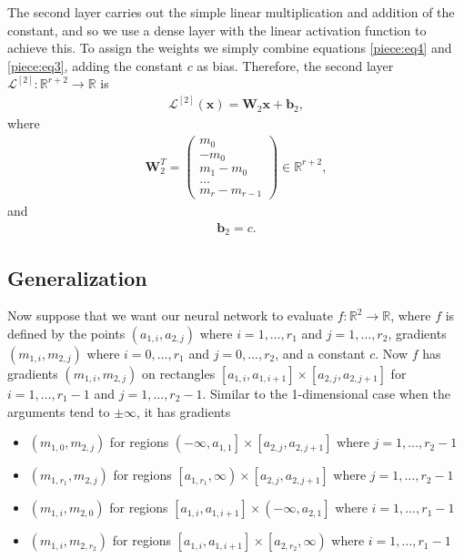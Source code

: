 \documentclass{somasmsc}
\begin{document}
The second layer carries out the simple linear multiplication and addition of the constant, and so we use a dense layer with the linear activation function to achieve this. To assign the weights we simply combine equations \ref{piece:eq4} and \ref{piece:eq3}, adding the constant $c$ as bias. Therefore, the second layer $\mathcal{L}^{\left[2\right]}: \mathbb{R}^{r+2} \rightarrow \mathbb{R}$ is
\begin{align*}
\mathcal{L}^{\left[2\right]}\left(\pmb{x}\right) = \mathbf{W}_2 \pmb{x} + \pmb{b}_2,
\end{align*}
where
\begin{align*}
\mathbf{W}_2^T =
\begin{pmatrix}
    m_0 \\
    -m_0 \\
    m_1 - m_0 \\
    \dots \\
    m_r - m_{r-1}
\end{pmatrix} \in \mathbb{R}^{r+2},
\end{align*}
and
\begin{align*}
\pmb{b}_2 = c.
\end{align*}

\subsection{Generalization}\label{piece:nd}

Now suppose that we want our neural network to evaluate $f:\mathbb{R}^2 \rightarrow \mathbb{R}$, where $f$ is defined by the points $\left(a_{1,i}, a_{2,j}\right)$ where $i=1, \dots, r_1$ and $j=1, \dots, r_2$, gradients $\left(m_{1,i}, m_{2,j}\right)$ where $i=0, \dots, r_1$ and $j=0, \dots, r_2$, and a constant $c$. Now $f$ has gradients $\left(m_{1,i}, m_{2,j}\right)$ on rectangles $\left[a_{1,i}, a_{1,i+1}\right] \times \left[a_{2,j}, a_{2,j+1}\right]$ for $i=1, \dots, r_1 - 1$ and $j=1, \dots, r_2 - 1$. Similar to the 1-dimensional case when the arguments tend to $\pm \infty$, it has gradients
\begin{itemize}
    \item $\left(m_{1,0}, m_{2,j}\right)$ for regions $\left(-\infty, a_{1,1}\right] \times \left[a_{2,j}, a_{2,j+1}\right]$ where $j=1, \dots, r_2 - 1$
    \item $\left(m_{1,r_1}, m_{2,j}\right)$ for regions $\left[a_{1, r_1}, \infty\right) \times \left[a_{2,j}, a_{2,j+1}\right]$ where $j=1, \dots, r_2 - 1$
    \item $\left(m_{1,i}, m_{2,0}\right)$ for regions $\left[a_{1,i}, a_{1,i+1}\right] \times \left(-\infty, a_{2,1}\right]$ where $i=1, \dots, r_1 - 1$
    \item $\left(m_{1,i}, m_{2,r_2}\right)$ for regions $\left[a_{1,i}, a_{1,i+1}\right] \times \left[a_{2,r_2}, \infty\right)$ where $i=1, \dots, r_1 - 1$
\end{itemize}
\end{document}
